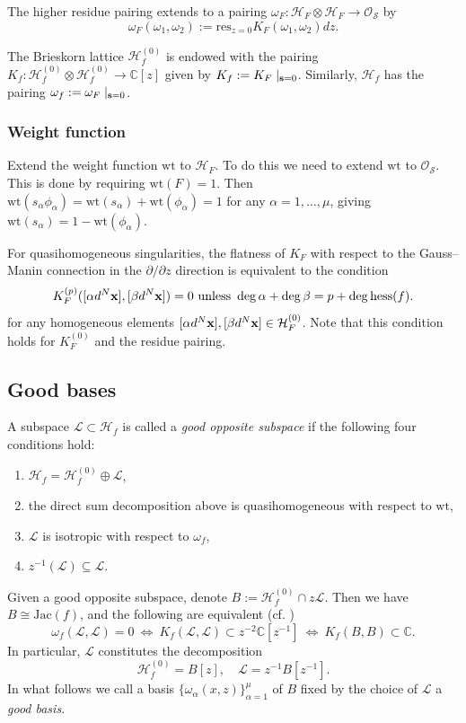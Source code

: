 \documentclass[12pt,a4paper]{amsart}
\newcommand{\CC}{{\mathbb{C}}}
\newcommand{\Jac}{\mathrm{Jac}}
\newcommand{\bx}{{\bf x}}
\newcommand{\hess}{\mathrm{hess}}
\newcommand{\res}{\mathrm{res}}
\newcommand{\wt}{\mathrm{wt}}
\def\H{{\mathcal H}}
\def\L{{\mathcal L}}
\def\O{{\mathcal O}}
\renewcommand{\S}{{\mathcal S}}
\newcommand{\p}{{\partial}}
\newcommand{\<}{\left<}
\renewcommand{\>}{\right>}
\newcommand{\bs}{{\bf s}}
\numberwithin{equation}{section}
\begin{document}
The higher residue pairing extends to a pairing $\omega_F : \H_F \otimes \H_F \to \O_\S$ by
\[
   \omega_F(\omega_1, \omega_2):= \res_{z=0} K_F(\omega_1, \omega_2) dz.
\]

The Brieskorn lattice $\H_f^{(0)}$ is endowed with the pairing $K_f: \H_f^{(0)} \otimes \H_f^{(0)} \to \CC[z]$ given by $K_f := K_F \mid_{\bs = 0}$. Similarly, $\H_f$ has the pairing $\omega_f := \omega_F \mid_{\bs =0}$.

\subsubsection{Weight function}
Extend the weight function $\wt$ to $\H_F$. To do this we need to extend $\wt$ to $\O_\S$. This is done by requiring $\wt(F) = 1$. Then $\wt (s_\alpha \phi_\alpha) = \wt (s_\alpha) + \wt(\phi_\alpha) = 1$ for any $\alpha=1,\dots,\mu$, giving $\wt (s_\alpha) = 1 - \wt(\phi_\alpha)$.

For quasihomogeneous singularities, the flatness of $K_F$ with respect to the Gauss--Manin connection in the $\p / \p z$ direction is equivalent to the condition
\[
   K_F^{(p)}([\alpha d^N\bx], [\beta d^N\bx] ) = 0 \ \text{unless} \ \deg \alpha + \deg \beta = p + \deg \hess(f).
\]
for any homogeneous elements  $[\alpha d^N\bx], [\beta d^N\bx] \in \H_F^{(0)}$. Note that this condition holds for $K_F^{(0)}$ and the residue pairing.

\subsection{Good bases}
A subspace $\L \subset \H_f$ is called a \textit{good opposite subspace} if the following four conditions hold:
\begin{enumerate}
    \item $\H_f= \H_f^{(0)} \oplus \L$,
    \item the direct sum decomposition above is quasihomogeneous with respect to $\wt$,
    \item $\L$ is isotropic with respect to $\omega_f$,
    \item $z^{-1}(\L) \subseteq \L$.
\end{enumerate}

Given a good opposite subspace, denote $B := \H_f^{(0)} \cap z \L$. Then we have $B \cong \Jac(f)$, and the following are equivalent (cf. \cite[Lemma$\backslash$Definition 2.16]{LLS})
\[
    \omega_f(\L,\L) = 0 \ \Leftrightarrow \ K_f(\L,\L) \subset z^{-2}\CC[z^{-1}] \ \Leftrightarrow \ K_f(B,B) \subset \CC.
\]
In particular, $\L$ constitutes the decomposition
\begin{equation}\label{eq: Hf0 via the good basis}
    \H^{(0)}_f = B[z], \quad \L = z^{-1} B[z^{-1}].
\end{equation}
In what follows we call a basis $\lbrace \omega_\alpha(x,z)\rbrace_{\alpha=1}^\mu$ of $B$ fixed by the choice of $\L$ a \textit{good basis}.
\end{document}

